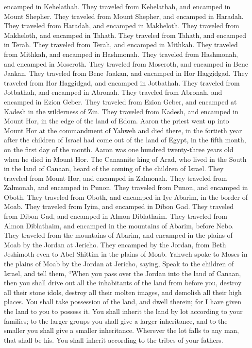 encamped in Kehelathah.  They traveled from Kehelathah,
and encamped in Mount Shepher.  They traveled from Mount
Shepher, and encamped in Haradah.  They traveled from
Haradah, and encamped in Makheloth.  They traveled from
Makheloth, and encamped in Tahath.  They traveled from
Tahath, and encamped in Terah.  They traveled from Terah,
and encamped in Mithkah.  They traveled from Mithkah, and
encamped in Hashmonah.  They traveled from Hashmonah, and
encamped in Moseroth.  They traveled from Moseroth, and
encamped in Bene Jaakan.  They traveled from Bene Jaakan,
and encamped in Hor Haggidgad.  They traveled from Hor
Haggidgad, and encamped in Jotbathah.  They traveled from
Jotbathah, and encamped in Abronah.  They traveled from
Abronah, and encamped in Ezion Geber.  They traveled from
Ezion Geber, and encamped at Kadesh in the wilderness of Zin.
 They traveled from Kadesh, and encamped in Mount Hor, in
the edge of the land of Edom.  Aaron the priest went up
into Mount Hor at the commandment of Yahweh and died there, in the
fortieth year after the children of Israel had come out of the land of
Egypt, in the fifth month, on the first day of the month.
 Aaron was one hundred twenty-three years old when he
died in Mount Hor.  The Canaanite king of Arad, who lived
in the South in the land of Canaan, heard of the coming of the children
of Israel.  They traveled from Mount Hor, and encamped in
Zalmonah.  They traveled from Zalmonah, and encamped in
Punon.  They traveled from Punon, and encamped in Oboth.
 They traveled from Oboth, and encamped in Iye Abarim, in
the border of Moab.  They traveled from Iyim, and
encamped in Dibon Gad.  They traveled from Dibon Gad, and
encamped in Almon Diblathaim.  They traveled from Almon
Diblathaim, and encamped in the mountains of Abarim, before Nebo.
 They traveled from the mountains of Abarim, and encamped
in the plains of Moab by the Jordan at Jericho.  They
encamped by the Jordan, from Beth Jeshimoth even to Abel Shittim in the
plains of Moab.  Yahweh spoke to Moses in the plains of
Moab by the Jordan at Jericho, saying,  Speak to the
children of Israel, and tell them, ``When you pass over the Jordan into
the land of Canaan,  then you shall drive out all the
inhabitants of the land from before you, destroy all their stone idols,
destroy all their molten images, and demolish all their high places.
 You shall take possession of the land, and dwell
therein; for I have given the land to you to possess it. 
You shall inherit the land by lot according to your families; to the
larger groups you shall give a larger inheritance, and to the smaller
you shall give a smaller inheritance. Wherever the lot falls to any man,
that shall be his. You shall inherit according to the tribes of your
fathers.

